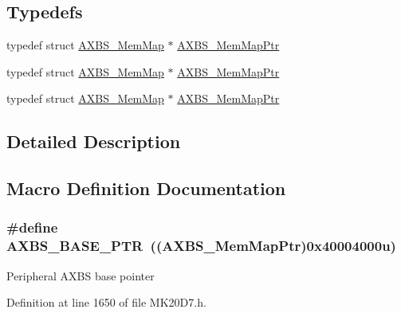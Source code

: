 \subsection*{Typedefs}
\begin{DoxyCompactItemize}
\item 
typedef struct \hyperlink{struct_a_x_b_s___mem_map}{A\+X\+B\+S\+\_\+\+Mem\+Map} $\ast$ \hyperlink{group___a_x_b_s___peripheral_ga8f768bd75d5c94d51b05e9ef4a38ea33}{A\+X\+B\+S\+\_\+\+Mem\+Map\+Ptr}
\item 
typedef struct \hyperlink{struct_a_x_b_s___mem_map}{A\+X\+B\+S\+\_\+\+Mem\+Map} $\ast$ \hyperlink{group___a_x_b_s___peripheral_ga8f768bd75d5c94d51b05e9ef4a38ea33}{A\+X\+B\+S\+\_\+\+Mem\+Map\+Ptr}
\item 
typedef struct \hyperlink{struct_a_x_b_s___mem_map}{A\+X\+B\+S\+\_\+\+Mem\+Map} $\ast$ \hyperlink{group___a_x_b_s___peripheral_ga8f768bd75d5c94d51b05e9ef4a38ea33}{A\+X\+B\+S\+\_\+\+Mem\+Map\+Ptr}
\end{DoxyCompactItemize}


\subsection{Detailed Description}


\subsection{Macro Definition Documentation}
\subsubsection[{\texorpdfstring{A\+X\+B\+S\+\_\+\+B\+A\+S\+E\+\_\+\+P\+TR}{AXBS_BASE_PTR}}]{\setlength{\rightskip}{0pt plus 5cm}\#define A\+X\+B\+S\+\_\+\+B\+A\+S\+E\+\_\+\+P\+TR~(({\bf A\+X\+B\+S\+\_\+\+Mem\+Map\+Ptr})0x40004000u)}\hypertarget{group___a_x_b_s___peripheral_gacbbf56489b86d1ddb3e0ac291922a56d}{}\label{group___a_x_b_s___peripheral_gacbbf56489b86d1ddb3e0ac291922a56d}
Peripheral A\+X\+BS base pointer 

Definition at line 1650 of file M\+K20\+D7.\+h.

